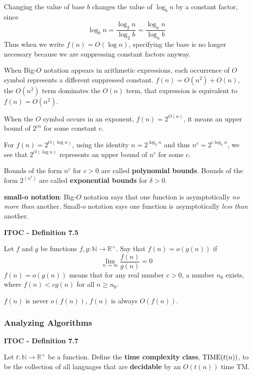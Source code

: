 Changing the value of base $b$ changes the value of $\log_b n$ by a constant factor, since 
\[
\log_b n = \frac{\log_2 n}{\log_2 b} = \frac{\log_a n}{\log_a b}
\]
Thus when we write $f(n) = O(\log n)$, specifying the base is no longer necessary because we are suppressing constant factors anyway.

When Big-$O$ notation appears in arithmetic expressions, each occurrence of $O$ symbol represents a different suppressed constant. $f(n) = O(n^2) + O(n)$, the $O(n^2)$ term dominates the $O(n)$ term, that expression is equivalent to $f(n) = O(n^2)$.

When the $O$ symbol occurs in an exponent, $f(n) = 2^{O(n)}$, it means an upper bound of $2^{cn}$ for some constant $c$.

For $f(n) = 2^{O(\log n)}$, using the identity $n = 2 ^{\log_2n}$ and thus $n^c = 2^{c\log_2n}$, we see that $2^{O(\log n)}$ represents an upper bound of $n^c$ for some $c$.

Bounds of the form $n^c$ for $c>0$ are called \textbf{polynomial bounds}. Bounds of the form $2^{(n^\delta)}$ are called \textbf{exponential bounds} for $\delta > 0$.

\textbf{small-o notation}: Big-$O$ notation says that one function is asymptotically \textit{no more than} another. Small-$o$ notation says one function is asymptotically \textit{less than} another.

\begin{shaded}
\textbf{ITOC - Definition 7.5}

\medskip
Let $f$ and $g$ be functions $f, g: \mathbb{N} \rightarrow \mathbb{R}^+$. Say that \textbf{$f(n) = o(g(n))$} if 
\[
\lim_{n\rightarrow \infty} \frac{f(n)}{g(n)} = 0
\]
$f(n) = o(g(n))$ means that for any real number $c > 0$, a number $n_0$ exists, where $f(n) < cg(n)$ for all $n \geq n_0$.
\end{shaded}

{\color{blue} $f(n)$ is never $o(f(n))$, $f(n)$ is always $O(f(n))$.}

\subsubsection{Analyzing Algorithms}

\begin{shaded}
\textbf{ITOC - Definition 7.7}

\medskip
Let $t: \mathbb{N} \rightarrow \mathbb{R}^+$ be a function. Define the \textbf{time complexity class}, \textbf{$\text{TIME}(t(n))$}, to be the collection of all languages that are \textbf{decidable} by an $O(t(n))$ time TM.
\end{shaded}

